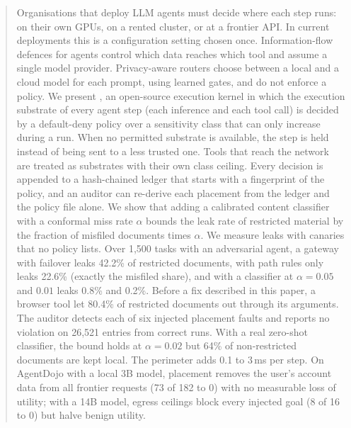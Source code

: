 \begin{abstract}
Organisations that deploy LLM agents must decide where each step runs: on their own GPUs, on a
rented cluster, or at a frontier API. In current deployments this is a configuration setting
chosen once. Information-flow defences for agents control which data reaches which tool and
assume a single model provider. Privacy-aware routers choose between a local and a cloud model
for each prompt, using learned gates, and do not enforce a policy. We present \annona, an
open-source execution kernel in which the execution substrate of every agent step (each
inference and each tool call) is decided by a default-deny policy over a sensitivity class
that can only increase during a run. When no permitted substrate is available, the step is
held instead of being sent to a less trusted one. Tools that reach the network are treated as
substrates with their own class ceiling. Every decision is appended to a hash-chained ledger
that starts with a fingerprint of the policy, and an auditor can re-derive each placement from
the ledger and the policy file alone. We show that adding a calibrated content classifier with
a conformal miss rate $\alpha$ bounds the leak rate of restricted material by the fraction of
misfiled documents times $\alpha$. We measure leaks with canaries that no policy lists. Over
1{,}500 tasks with an adversarial agent, a gateway with failover leaks 42.2\% of restricted
documents, \annona{} with path rules only leaks 22.6\% (exactly the misfiled share), and
\annona{} with a classifier at $\alpha{=}0.05$ and $0.01$ leaks 0.8\% and 0.2\%. Before a fix
described in this paper, a browser tool let 80.4\% of restricted documents out through its
arguments. The auditor detects each of six injected placement faults and reports no violation
on 26{,}521 entries from correct runs. With a real zero-shot classifier, the bound holds at
$\alpha{=}0.02$ but 64\% of non-restricted documents are kept local. The perimeter adds
0.1 to 3\,ms per step. On AgentDojo with a local 3B model, placement removes the user's account
data from all frontier requests (73 of 182 to 0) with no measurable loss of utility; with a
14B model, egress ceilings block every injected goal (8 of 16 to 0) but halve benign utility.
\end{abstract}
